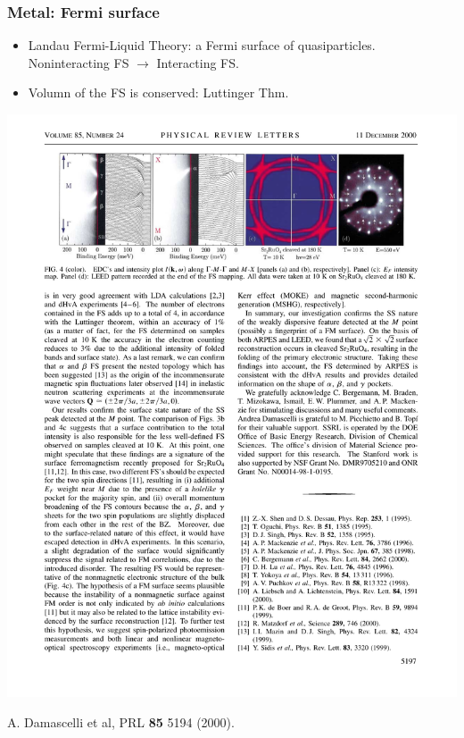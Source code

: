 \documentclass[xcolor=table, 10pt, aspectratio=43]{beamer}
\begin{document}
\begin{frame}
  \frametitle{Metal: Fermi surface}
\begin{itemize}
  \item Landau Fermi-Liquid Theory: a Fermi surface of quasiparticles.\\
  Noninteracting FS $\rightarrow$ Interacting FS.
  \item Volumn of the FS is conserved: Luttinger Thm.
\end{itemize}
\begin{center}
	\includegraphics{../resources/SrRuO_FS}

	{\small A. Damascelli et al, PRL \textbf{85} 5194 (2000).}
\end{center}
\end{frame}
\end{document}
